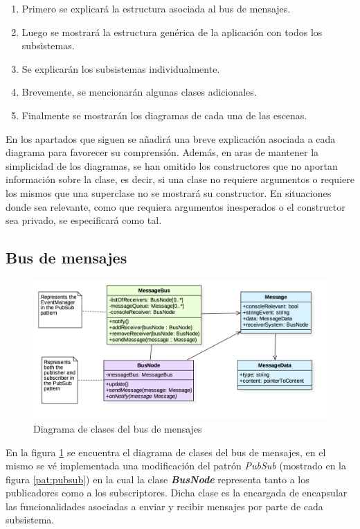 \begin{enumerate}
	\item Primero se explicará la estructura asociada al bus de mensajes.
	\item Luego se mostrará la estructura genérica de la aplicación con todos los subsistemas.
	\item Se explicarán los subsistemas individualmente.
	\item Brevemente, se mencionarán algunas clases adicionales.
	\item Finalmente se mostrarán los diagramas de cada una de las escenas.
\end{enumerate}

En los apartados que siguen se añadirá una breve explicación asociada a cada diagrama para favorecer su comprensión.  Además, en aras de mantener la simplicidad de los diagramas, se han omitido los constructores que no aportan información sobre la clase, es decir, si una clase no requiere argumentos o requiere los mismos que una superclase no se mostrará su constructor. En situaciones donde sea relevante, como que requiera argumentos inesperados o el constructor sea privado, se especificará como tal.

\subsection{Bus de mensajes}

\begin{figure}
	\centerline{\includegraphics[width=15cm]{otros/UML/png/alld/png/messaging__diagramaDeClases_messaging_11.png}}
	\caption{Diagrama de clases del bus de mensajes}
	\label{class:messageBus}
\end{figure}

En la figura \ref{class:messageBus} se encuentra el diagrama de clases del bus de mensajes, en el mismo se vé implementada una modificación del patrón \textit{PubSub} (mostrado en la figura \ref{pat:pubsub}) en la cual la clase \textbf{\textit{BusNode}} representa tanto a los publicadores como a los subscriptores. Dicha clase es la encargada de encapsular las funcionalidades asociadas a enviar y recibir mensajes por parte de cada subsistema.

